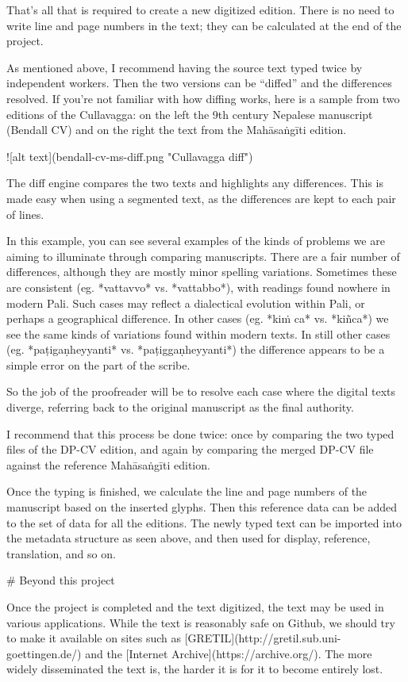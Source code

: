 \documentclass[11pt, openany,a5paper]{article}
\begin{document}
\begin{markdown}
That’s all that is required to create a new digitized edition. There is no need to write line and page numbers in the text; they can be calculated at the end of the project.

As mentioned above, I recommend having the source text typed twice by independent workers. Then the two versions can be “diffed” and the differences resolved. If you’re not familiar with how diffing works, here is a sample from two editions of the Cullavagga: on the left the 9th century Nepalese manuscript (Bendall CV) and on the right the text from the Mahāsaṅgīti edition.

![alt text](bendall-cv-ms-diff.png "Cullavagga diff")

The diff engine compares the two texts and highlights any differences. This is made easy when using a segmented text, as the differences are kept to each pair of lines.

In this example, you can see several examples of the kinds of problems we are aiming to illuminate through comparing manuscripts. There are a fair number of differences, although they are mostly minor spelling variations. Sometimes these are consistent (eg. *vattavvo* vs. *vattabbo*), with readings found nowhere in modern Pali. Such cases may reflect a dialectical evolution within Pali, or perhaps a geographical difference. In other cases (eg. *kiṁ ca* vs. *kiñca*) we see the same kinds of variations found within modern texts. In still other cases (eg. *paṭigaṇheyyanti* vs. *paṭiggaṇheyyanti*) the difference appears to be a simple error on the part of the scribe.

So the job of the proofreader will be to resolve each case where the digital texts diverge, referring back to the original manuscript as the final authority.

I recommend that this process be done twice: once by comparing the two typed files of the DP-CV edition, and again by comparing the merged DP-CV file against the reference Mahāsaṅgīti edition.

Once the typing is finished, we calculate the line and page numbers of the manuscript based on the inserted glyphs. Then this reference data can be added to the set of data for all the editions. The newly typed text can be imported into the metadata structure as seen above, and then used for display, reference, translation, and so on.

# Beyond this project

Once the project is completed and the text digitized, the text may be used in various applications. While the text is reasonably safe on Github, we should try to make it available on sites such as [GRETIL](http://gretil.sub.uni-goettingen.de/) and the [Internet Archive](https://archive.org/). The more widely disseminated the text is, the harder it is for it to become entirely lost.


\end{markdown}
\end{document}
